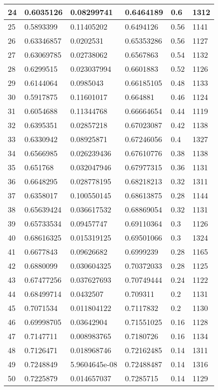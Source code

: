 \begin{longtable}{|l|l|l|l|l|l|}
24 & 0.6035126 & 0.08299741 & 0.6464189 & 0.6 & 1312 \\ \hline 
25 & 0.5893399 & 0.11405202 & 0.6494126 & 0.56 & 1141 \\ \hline 
26 & 0.63346857 & 0.0202531 & 0.65353286 & 0.56 & 1127 \\ \hline 
27 & 0.63069785 & 0.02738062 & 0.6567863 & 0.54 & 1132 \\ \hline 
28 & 0.6299515 & 0.023037994 & 0.6601883 & 0.52 & 1126 \\ \hline 
29 & 0.6144064 & 0.0985043 & 0.66185105 & 0.48 & 1133 \\ \hline 
30 & 0.5917875 & 0.11601017 & 0.664881 & 0.46 & 1124 \\ \hline 
31 & 0.6054688 & 0.11344768 & 0.66664654 & 0.44 & 1119 \\ \hline 
32 & 0.6395351 & 0.02857218 & 0.67023087 & 0.42 & 1138 \\ \hline 
33 & 0.6330942 & 0.08925871 & 0.67246056 & 0.4 & 1327 \\ \hline 
34 & 0.6566985 & 0.026239436 & 0.67610776 & 0.38 & 1138 \\ \hline 
35 & 0.651768 & 0.032047946 & 0.67977315 & 0.36 & 1131 \\ \hline 
36 & 0.6648295 & 0.028778195 & 0.68218213 & 0.32 & 1311 \\ \hline 
37 & 0.6358017 & 0.100550145 & 0.68613875 & 0.28 & 1144 \\ \hline 
38 & 0.65639424 & 0.036617532 & 0.68869054 & 0.32 & 1131 \\ \hline 
39 & 0.65733534 & 0.09457747 & 0.69110364 & 0.3 & 1126 \\ \hline 
40 & 0.68616325 & 0.015319125 & 0.69501066 & 0.3 & 1324 \\ \hline 
41 & 0.6677843 & 0.09626682 & 0.6999239 & 0.28 & 1165 \\ \hline 
42 & 0.6880099 & 0.030604325 & 0.70372033 & 0.28 & 1125 \\ \hline 
43 & 0.67477256 & 0.037627693 & 0.70749444 & 0.24 & 1122 \\ \hline 
44 & 0.68499714 & 0.0432507 & 0.709311 & 0.2 & 1131 \\ \hline 
45 & 0.7071534 & 0.011804122 & 0.7117832 & 0.2 & 1130 \\ \hline 
46 & 0.69998705 & 0.03642904 & 0.71551025 & 0.16 & 1128 \\ \hline 
47 & 0.7147711 & 0.008983765 & 0.7180726 & 0.16 & 1134 \\ \hline 
48 & 0.7126471 & 0.018968746 & 0.72162485 & 0.14 & 1311 \\ \hline 
49 & 0.7248849 & 5.9604645e-08 & 0.72488487 & 0.14 & 1316 \\ \hline 
50 & 0.7225879 & 0.014657037 & 0.7285715 & 0.14 & 1129 \\ \hline 
\end{longtable}